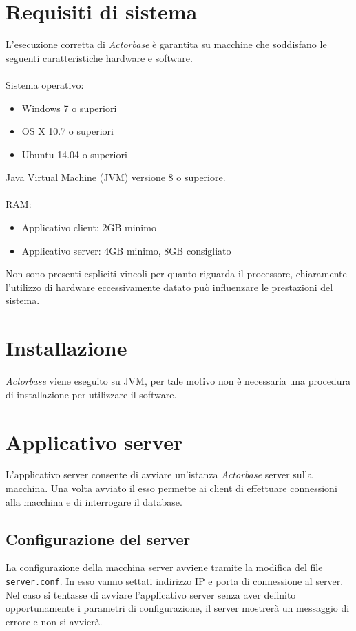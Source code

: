 \documentclass[a4paper]{article}
\begin{document}
	\section{Requisiti di sistema}	
	L'esecuzione corretta di \emph{Actorbase} è garantita su macchine che soddisfano le seguenti caratteristiche hardware e software.
	\\ \\
	Sistema operativo:
	\begin{itemize}
		\item Windows 7 o superiori
		\item OS X 10.7 o superiori
		\item Ubuntu 14.04 o superiori
	\end{itemize}
	Java Virtual Machine (JVM) versione 8 o superiore.
	\\ \\
	RAM:
	\begin{itemize}
		\item Applicativo client: 2GB minimo
		\item Applicativo server: 4GB minimo, 8GB consigliato
	\end{itemize}
	Non sono presenti espliciti vincoli per quanto riguarda il processore, chiaramente l'utilizzo di hardware eccessivamente datato può influenzare le prestazioni del sistema.
	
	\section{Installazione}
	\emph{Actorbase} viene eseguito su JVM, per tale motivo non è necessaria una procedura di installazione per utilizzare il software. 
	\newpage



	\section{Applicativo server}
	L'applicativo server consente di avviare un'istanza \emph{Actorbase} server sulla macchina. Una volta avviato il esso permette ai client di effettuare connessioni alla macchina e di interrogare il database. 
	
	\subsection{Configurazione del server}
	La configurazione della macchina server avviene tramite la modifica del file \texttt{server.conf}. In esso vanno settati indirizzo IP e porta di connessione al server.
	\\
	Nel caso si tentasse di avviare l'applicativo server senza aver definito opportunamente i parametri di configurazione, il server mostrerà un messaggio di errore e non si avvierà.
	
\end{document}
